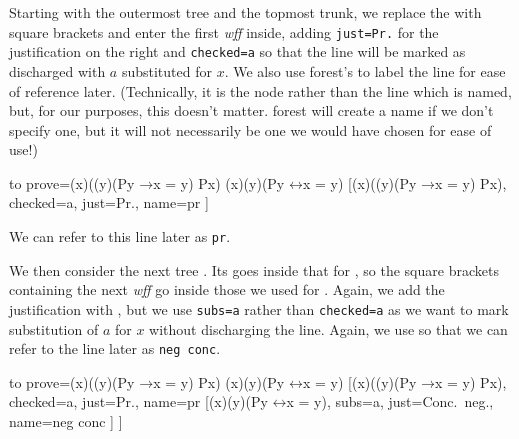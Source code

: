\documentclass[10pt,british,a4paper]{ltxdoc}
\newcommand*\pkg[1]{\textsf{#1}}
\newcommand*{\lif}{\ensuremath{\mathbin{\rightarrow}}}
\newcommand*{\liff}{\ensuremath{\mathbin{\leftrightarrow}}}
\newcommand*\wff{\emph{wff}}
\begin{document}
Starting with the outermost tree \nyth*{} and the topmost trunk, we replace the \bocsnyth{} with square brackets and enter the first \wff{} inside, adding \verb|just=Pr.| for the justification on the right and \verb|checked=a| so that the line will be marked as discharged with $a$ substituted for $x$.
We also use \pkg{forest}'s  to label the line for ease of reference later.
(Technically, it is the node rather than the line which is named, but, for our purposes, this doesn't matter.
\pkg{forest} will create a name if we don't specify one, but it will not necessarily be one we would have chosen for ease of use!)
\begin{latexcode}
\begin{prooftree}
  {
    to prove={(\exists x)((\forall y)(Py \lif x = y) \land Px) \sststile{}{} (\exists x)(\forall y)(Py \liff x = y)}
  }
  [{(\exists x)((\forall y)(Py \lif x = y) \land Px)}, checked=a, just=Pr., name=pr
  ]
\end{prooftree}
\end{latexcode}
We can refer to this line later as \verb|pr|.

We then consider the next tree \nyth*{}.
Its \bocsnyth{} goes inside that for \nyth[1], so the square brackets containing the next \wff{} go inside those we used for \nyth[1].
Again, we add the justification with , but we use \verb|subs=a| rather than \verb|checked=a| as we want to mark substitution of $a$ for $x$ without discharging the line.
Again, we use  so that we can refer to the line later as \verb|neg conc|.
\begin{latexcode}
\begin{prooftree}
  {
    to prove={(\exists x)((\forall y)(Py \lif x = y) \land Px) \sststile{}{} (\exists x)(\forall y)(Py \liff x = y)}
  }
  [{(\exists x)((\forall y)(Py \lif x = y) \land Px)}, checked=a, just=Pr., name=pr
    [{\lnot (\exists x)(\forall y)(Py \liff x = y)}, subs=a, just=Conc.~neg., name=neg conc
    ]
  ]
\end{prooftree}
\end{latexcode}
\end{document}
